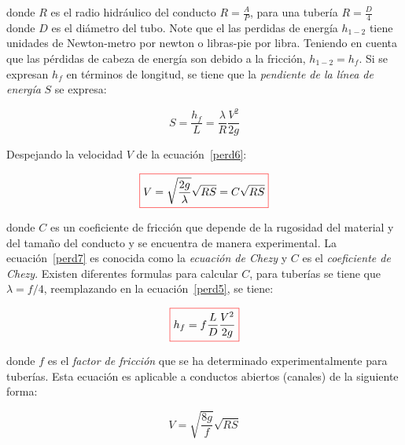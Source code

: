 \documentclass[11pt, oneside]{article}
\begin{document}
donde $R$ es el radio hidr\'aulico del conducto $R = \frac{A}{P}$, para una tuber\'ia $R= \frac{D}{4}$ donde $D$ es el di\'ametro del tubo. Note que el las perdidas de energ\'ia $h_{1-2}$ tiene unidades de Newton-metro por newton o libras-pie por libra. Teniendo en cuenta que las p\'erdidas de cabeza de energ\'ia son debido a la fricci\'on, $h_{1-2} = h_f$. Si se expresan $h_f$ en t\'erminos de longitud, se tiene que la \emph{pendiente de la l\'inea de energ\'ia} $S$ se expresa:

\begin{equation}
S = \frac{h_f}{L} = \frac{\lambda}{R}\frac{V^2}{2g} 
\label{perd6}
\end{equation}

Despejando la velocidad $V$ de la ecuaci\'on~\ref{perd6}:

\begin{equation}
\color{red}\boxed{\color{black} V = \sqrt{\frac{2g}{\lambda}}\sqrt{RS} = C \sqrt{RS} }
\label{perd7}
\end{equation}

donde $C$ es un coeficiente de fricci\'on que depende de la rugosidad del material y del tama\~no del conducto y se encuentra de manera experimental. La ecuaci\'on~\ref{perd7} es conocida como la \emph{ecuaci\'on de Chezy} y $C$ es el \emph{coeficiente de Chezy}. Existen diferentes formulas para calcular $C$, para tuber\'ias se tiene que $\lambda = f/4$, reemplazando en la ecuaci\'on~\ref{perd5}, se tiene:

\begin{equation}
\color{red}\boxed{\color{black} h_f = f \frac{L}{D} \frac{V^2}{2g}}
\label{perd8}
\end{equation}

donde $f$ es el \emph{factor de fricci\'on} que se ha determinado experimentalmente para tuber\'ias. Esta ecuaci\'on es aplicable a conductos abiertos (canales) de la siguiente forma:

\begin{equation}
V = \sqrt{\frac{8g}{f}}\sqrt{RS}
\label{perd9}
\end{equation}
\end{document}
